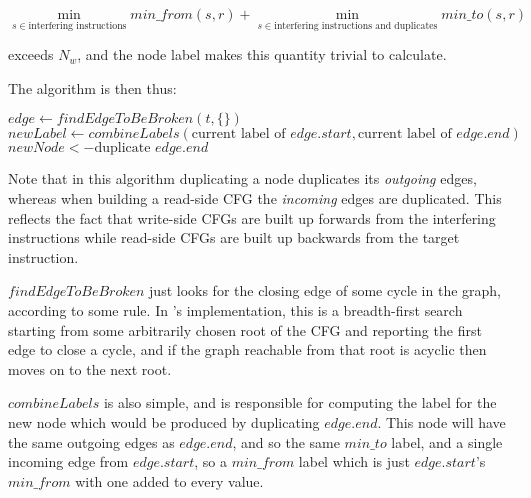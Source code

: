 \begin{displaymath}
\min_{s \in \textrm{interfering instructions}}min\_from(s, r) + \min_{s \in \textrm{interfering instructions and duplicates}}min\_to(s, r)
\end{displaymath}

exceeds $N_w$, and the node label makes this quantity trivial to
calculate.

The algorithm is then thus:

\begin{algorithmic}
       \State $edge \gets findEdgeToBeBroken(t, \{\})$
       \State $newLabel \gets combineLabels(\text{current label of } edge.start, \text{current label of } edge.end)$
       \Else
           \State $newNode <- \text{duplicate } edge.end$
           \EndFor
       \EndIf
    \EndWhile
  \EndFor
\end{algorithmic}

Note that in this algorithm duplicating a node duplicates its
\emph{outgoing} edges, whereas when building a read-side CFG the
\emph{incoming} edges are duplicated.  This reflects the fact that
write-side CFGs are built up forwards from the interfering
instructions while read-side CFGs are built up backwards from the
target instruction.  

$findEdgeToBeBroken$ just looks for the closing edge of some cycle in
the graph, according to some rule.  In {\implementation}'s
implementation, this is a breadth-first search starting from some
arbitrarily chosen root of the CFG and reporting the first edge to
close a cycle, and if the graph reachable from that root is acyclic
then {\implementation} moves on to the next root.

$combineLabels$ is also simple, and is responsible for computing the
label for the new node which would be produced by duplicating
$edge.end$.  This node will have the same outgoing edges as
$edge.end$, and so the same $min\_to$ label, and a single incoming
edge from $edge.start$, so a $min\_from$ label which is just
$edge.start$'s $min\_from$ with one added to every value.

